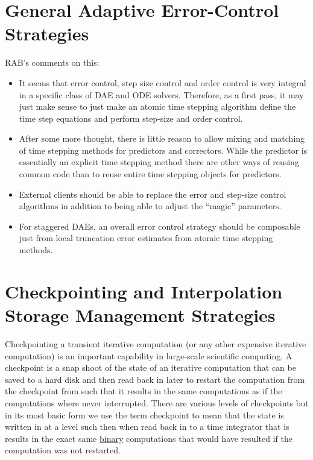 \documentclass[pdf,ps2pdf,11pt]{SANDreport}
\begin{document}
\section{General Adaptive Error-Control Strategies}

RAB's comments on this:
\begin{itemize}
%
{}\item It seems that error control, step size control and order control is
very integral in a specific class of DAE and ODE solvers.  Therefore, as a
first pass, it may just make sense to just make an atomic time stepping
algorithm define the time step equations and perform step-size and order
control.
%
{}\item After some more thought, there is little reason to allow mixing and
matching of time stepping methods for predictors and correctors.  While the
predictor is essentially an explicit time stepping method there are other ways
of reusing common code than to reuse entire time stepping objects for
predictors.
%
{}\item External clients should be able to replace the error and step-size
control algorithms in addition to being able to adjust the ``magic''
parameters.
%
{}\item For staggered DAEs, an overall error control strategy should be
composable just from local truncation error estimates from atomic time
stepping methods.
%
\end{itemize}

\section{Checkpointing and Interpolation Storage Management Strategies}

Checkpointing a transient iterative computation (or any other expensive
iterative computation) is an important capability in large-scale scientific
computing.  A checkpoint is a snap shoot of the state of an iterative
computation that can be saved to a hard disk and then read back in later to
restart the computation from the checkpoint from such that it results in the
same computations as if the computations where never interrupted.  There are
various levels of checkpoints but in its most basic form we use the term
checkpoint to mean that the state is written in at a level such then when read
back in to a time integrator that is results in the exact same
{}\underline{binary} computations that would have resulted if the computation
was not restarted.
\end{document}

